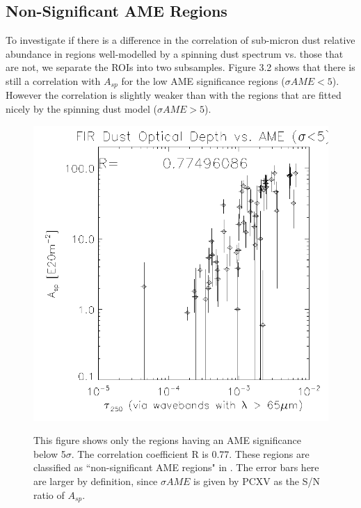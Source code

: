 \subsection{Non-Significant AME Regions}
     To investigate if there is a difference in the correlation of sub-micron dust relative abundance in regions well-modelled by a spinning dust spectrum vs. those that are not, we separate the ROIs into two subsamples. Figure 3.2 shows that there is still a correlation with $A_{sp}$ for the low AME significance regions ($\sigma AME < 5$). However the correlation is slightly weaker than with the regions that are fitted nicely by the spinning dust model ($\sigma AME > 5$).      
\begin{figure}[!htbp]
\begin{center}
\label{fig:tauvsaspnosp}
\includegraphics[width=150mm]{EPS/tau250vsAspnosp_masterpres.pdf}
  \caption{ This figure shows only the regions having an AME significance below 5$\sigma$. The correlation coefficient R is 0.77. These regions are classified as ``non-significant AME regions" in \cite{planckXV}. The error bars here are larger by definition, since $\sigma AME$ is given by PCXV as the S/N ratio of $A_{sp}$.}
\label{sub-micron dust vs. Spinning dust}
\end{center}
\end{figure}

